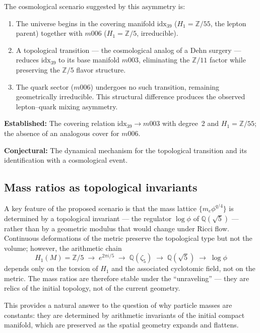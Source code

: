 \documentclass[12pt]{article}
\theoremstyle{definition}
\begin{document}
The cosmological scenario suggested by this asymmetry is:
\begin{enumerate}
\item The universe begins in the covering manifold
  $\text{idx}_{39}$ ($H_1 = \mathbb{Z}/55$, the lepton parent)
  together with $m006$ ($H_1 = \mathbb{Z}/5$, irreducible).
\item A topological transition --- the cosmological analog of a
  Dehn surgery --- reduces $\text{idx}_{39}$ to its base manifold
  $m003$, eliminating the $\mathbb{Z}/11$ factor while preserving
  the $\mathbb{Z}/5$ flavor structure.
\item The quark sector ($m006$) undergoes no such transition,
  remaining geometrically irreducible. This structural difference
  produces the observed lepton--quark mixing asymmetry.
\end{enumerate}

\textbf{Established:} The covering relation $\text{idx}_{39}
\to m003$ with degree~2 and $H_1 = \mathbb{Z}/55$; the absence of
an analogous cover for $m006$.

\textbf{Conjectural:} The dynamical mechanism for the topological
transition and its identification with a cosmological event.

\subsection{Mass ratios as topological invariants}

A key feature of the proposed scenario is that the mass lattice
$\{m_e \phi^{q/4}\}$ is determined by a topological invariant ---
the regulator $\log\phi$ of $\mathbb{Q}(\sqrt{5})$ --- rather than
by a geometric modulus that would change under Ricci flow. Continuous
deformations of the metric preserve the topological type but not
the volume; however, the arithmetic chain
\[
  H_1(M) = \mathbb{Z}/5 \;\longrightarrow\; e^{2\pi i/5}
  \;\longrightarrow\; \mathbb{Q}(\zeta_5)
  \;\longrightarrow\; \mathbb{Q}(\sqrt{5})
  \;\longrightarrow\; \log\phi
\]
depends only on the torsion of $H_1$ and the associated cyclotomic
field, not on the metric. The mass ratios are therefore stable under
the ``unraveling'' --- they are relics of the initial topology, not
of the current geometry.

This provides a natural answer to the question of why particle
masses are constants: they are determined by arithmetic invariants
of the initial compact manifold, which are preserved as the spatial
geometry expands and flattens.
\end{document}
